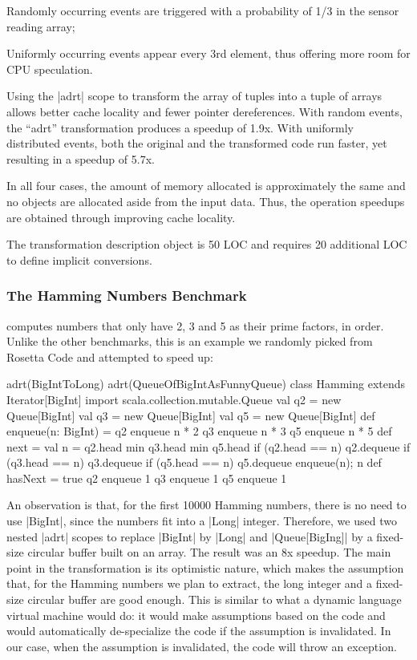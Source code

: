 \begin{compactitem}
 \item Randomly occurring events are triggered with a probability of 1/3 in the sensor reading array;
 \item Uniformly occurring events appear every 3rd element, thus offering more room for CPU speculation.
\end{compactitem}

Using the |adrt| scope to transform the array of tuples into a tuple of arrays allows better cache locality and fewer pointer dereferences. With random events, the ``adrt'' transformation produces a speedup of 1.9x. With uniformly distributed events, both the original and the transformed code run faster, yet resulting in a speedup of 5.7x.

In all four cases, the amount of memory allocated is approximately the same and no objects are allocated aside from the input data. Thus, the operation speedups are obtained through improving cache locality.

The transformation description object is 50 LOC and requires 20 additional LOC to define implicit conversions.

\subsubsection{The Hamming Numbers Benchmark} computes numbers that only have 2, 3 and 5 as their prime factors, in order. Unlike the other benchmarks, this is an example we randomly picked from Rosetta Code \cite{rosetta-code} and attempted to speed up:

\begin{lstlisting-nobreak}
adrt(BigIntToLong) {
  adrt(QueueOfBigIntAsFunnyQueue) {
    class Hamming extends Iterator[BigInt] {
      import scala.collection.mutable.Queue
      val q2 = new Queue[BigInt]
      val q3 = new Queue[BigInt]
      val q5 = new Queue[BigInt]
      def enqueue(n: BigInt) = {
        q2 enqueue n * 2
        q3 enqueue n * 3
        q5 enqueue n * 5
      }
      def next = {
        val n = q2.head min q3.head min q5.head
        if (q2.head == n) q2.dequeue
        if (q3.head == n) q3.dequeue
        if (q5.head == n) q5.dequeue
        enqueue(n); n
      }
      def hasNext = true
      q2 enqueue 1
      q3 enqueue 1
      q5 enqueue 1
    }
  }
}
\end{lstlisting-nobreak}

An observation is that, for the first 10000 Hamming numbers, there is no need to use |BigInt|, since the numbers fit into a |Long| integer. Therefore, we used two nested |adrt| scopes to replace |BigInt| by |Long| and |Queue[BigIng]| by a fixed-size circular buffer built on an array. The result was an 8x speedup. The main point in the transformation is its optimistic nature, which makes the assumption that, for the Hamming numbers we plan to extract, the long integer and a fixed-size circular buffer are good enough. This is similar to what a dynamic language virtual machine would do: it would make assumptions based on the code and would automatically de-specialize the code if the assumption is invalidated. In our case, when the assumption is invalidated, the code will throw an exception.

